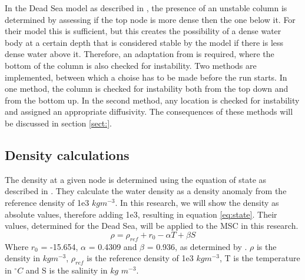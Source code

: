 \documentclass[twocolumn]{article}
\begin{document}
In the Dead Sea model as described in \cite{Heiden2017Application}, the presence of an unstable column is determined by assessing if the top node is more dense then the one below it. For their model this is sufficient, but this creates the possibility of a dense water body at a certain depth that is considered stable by the model if there is less dense water above it. Therefore, an adaptation from \cite{Heiden2017Application} is required, where the bottom of the column is also checked for instability. Two methods are implemented, between which a choise has to be made before the run starts. In one method, the column is checked for instability both from the top down and from the bottom up. In the second method, any location is checked for instability and assigned an appropriate diffusivity. The consequences of these methods will be discussed in section \ref{sect:}.

\subsection{Density calculations}
The density at a given node is determined using the equation of state as described in \cite{ivanov2002model}. They calculate the water density as a density anomaly from the reference density of 1e3 $kg m^{-3}$. In this research, we will show the density as absolute values, therefore adding 1e3, resulting in equation \ref{eq:state}. Their values, determined for the Dead Sea, will be applied to the MSC in this research.
\begin{equation}
    \rho = \rho_{ref} + r_0 - \alpha T + \beta S
\label{eq:state}
\end{equation}
Where $r_0$ = -15.654, $\alpha$ = 0.4309 and $\beta$ = 0.936, as determined by \cite{ivanov2002model}. $\rho$ is the density in $kg m^{-3}$, $\rho_{ref}$ is the reference density of 1e3 $kg m^{-3}$, T is the temperature in $^{\circ} C$ and S is the salinity in $kg$ $m^{-3}$. 





\end{document}
